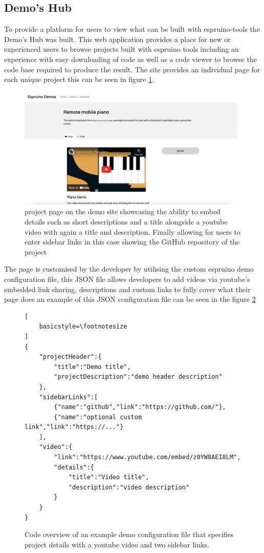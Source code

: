 \documentclass{l4proj}
\begin{document}
\subsection{Demo's Hub}
To provide a platform for users to view what can be built with espruino-tools the Demo's Hub was built. This web application provides a place for new or experienced users to browse projects built with espruino tools including an experience with easy downloading of code as well as a code viewer to browse the code base required to produce the result. The site provides an individual page for each unique project this can be seen in figure \ref{fig:demo-page}.

\begin{figure}[!ht]
    \centering
    \includegraphics[width=11cm]{dissertation/images/demo-page.png}
    \caption{project page on the demo site showcasing the ability to embed details such as short descriptions and a title alongside a youtube video with again a title and description. Finally allowing for users to enter sidebar links in this case showing the GitHub repository of the project}
    \label{fig:demo-page}
\end{figure}

The page is customised by the developer by utilising the custom espruino demo configuration file, this JSON file allows developers to add videos via youtube's embedded link sharing, descriptions and custom links to fully cover what their page does an example of this JSON configuration file can be seen in the figure \ref{fig:demo-config}

\begin{figure}[H]
    \centering
    \begin{minipage}{10cm}
    \begin{lstlisting}[
    basicstyle=\footnotesize
]
{
    "projectHeader":{
        "title":"Demo title",
        "projectDescription":"demo header description"
    },
    "sidebarLinks":[
        {"name":"github","link":"https://github.com/"},
        {"name":"optional custom link","link":"https://..."}
    ],
    "video":{
        "link":"https://www.youtube.com/embed/z0YW8AEI8LM",
        "details":{
            "title":"Video title",
            "description":"video description"
        }
    }
}
    \end{lstlisting}
    \end{minipage}
    \caption{Code overview of an example demo configuration file that specifies project details with a youtube video and two sidebar links.}
    \label{fig:demo-config}
\end{figure}
\end{document}
